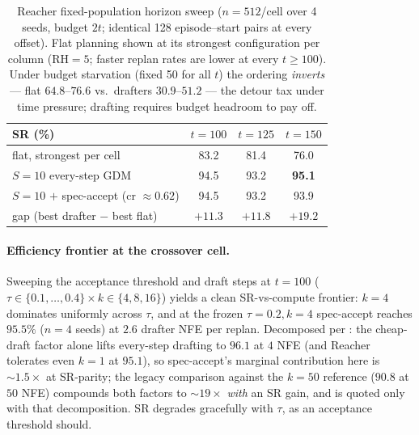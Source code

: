 \documentclass{article}
\newcommand{\ours}[1]{\textbf{#1}}          %
\newcommand{\gdm}{\text{GDM}}
\begin{document}
\begin{table}[h]
\centering
\small
\setlength{\tabcolsep}{5pt}
\caption{Reacher fixed-population horizon sweep ($n{=}512$/cell over 4 seeds, budget
$2t$; identical 128 episode--start pairs at every offset). Flat planning shown at its
strongest configuration per column (RH${=}5$; faster replan rates are lower at every
$t\geq100$). Under budget starvation (fixed 50 for all $t$) the ordering \emph{inverts}
--- flat $64.8$--$76.6$ vs.\ drafters $30.9$--$51.2$ --- the detour tax under time
pressure; drafting requires budget headroom to pay off.}
\label{tab:reacher-horizon}
\begin{tabular}{lccc}
\toprule
SR (\%) & $t{=}100$ & $t{=}125$ & $t{=}150$ \\
\midrule
flat, strongest per cell            & 83.2 & 81.4 & 76.0 \\
$S{=}10$ every-step $\gdm$          & 94.5 & 93.2 & \ours{95.1} \\
$S{=}10$ $+$ spec-accept (cr $\approx 0.62$) & 94.5 & 93.2 & 93.9 \\
\midrule
gap (best drafter $-$ best flat)    & $+11.3$ & $+11.8$ & $+19.2$ \\
\bottomrule
\end{tabular}
\end{table}

\paragraph{Efficiency frontier at the crossover cell.}
Sweeping the acceptance threshold and draft steps at $t{=}100$
($\tau\in\{0.1,\ldots,0.4\}\times k\in\{4,8,16\}$) yields a clean SR-vs-compute
frontier: $k{=}4$ dominates uniformly across $\tau$, and at the frozen
$\tau{=}0.2,k{=}4$ spec-accept reaches $95.5\%$ ($n{=}4$ seeds) at $2.6$ drafter NFE
per replan. Decomposed per : the cheap-draft factor alone lifts
every-step drafting to $96.1$ at $4$ NFE (and Reacher tolerates even $k{=}1$ at
$95.1$), so spec-accept's marginal contribution here is ${\sim}1.5\times$ at SR-parity;
the legacy comparison against the $k{=}50$ reference ($90.8$ at $50$ NFE) compounds
both factors to ${\sim}19\times$ \emph{with} an SR gain, and is quoted only with that
decomposition. SR degrades gracefully with $\tau$, as an acceptance threshold should.
\end{document}
